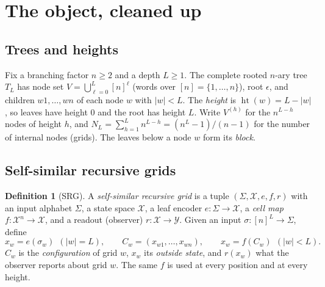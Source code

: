 \documentclass[11pt]{article}
\theoremstyle{definition}
\newtheorem{definition}[theorem]{Definition}
\newcommand{\hgt}{\operatorname{ht}}
\newcommand{\Nint}{N_{L}}
\newcommand{\cX}{\mathcal{X}}
\begin{document}
\tableofcontents

\section{The object, cleaned up}\label{sec:def}

\subsection{Trees and heights}
Fix a branching factor $n\ge 2$ and a depth $L\ge1$. The complete rooted $n$-ary tree $T_L$ has
node set $V=\bigcup_{\ell=0}^{L}[n]^\ell$ (words over $[n]=\{1,\dots,n\}$), root $\epsilon$,
and children $w1,\dots,wn$ of each node $w$ with $|w|<L$. The \emph{height} is
$\hgt(w)=L-|w|$, so leaves have height $0$ and the root has height $L$. Write $V^{(h)}$ for the
$n^{L-h}$ nodes of height $h$, and $\Nint=\sum_{h=1}^{L}n^{L-h}=(n^L-1)/(n-1)$ for the number of
internal nodes (grids). The leaves below a node $w$ form its \emph{block}.

\subsection{Self-similar recursive grids}
\begin{definition}[SRG]\label{def:srg}
A \emph{self-similar recursive grid} is a tuple $(\Sigma,\cX,e,f,r)$ with an input alphabet
$\Sigma$, a state space $\cX$, a leaf encoder $e:\Sigma\to\cX$, a \emph{cell map}
$f:\cX^n\to\cX$, and a readout (observer) $r:\cX\to\mathcal Y$. Given an input
$\sigma:[n]^L\to\Sigma$, define
\[
x_w=e(\sigma_w)\ \ (|w|=L),\qquad C_w=(x_{w1},\dots,x_{wn}),\qquad x_w=f(C_w)\ \ (|w|<L).
\]
$C_w$ is the \emph{configuration} of grid $w$, $x_w$ its \emph{outside state}, and $r(x_w)$ what
the observer reports about grid $w$. The same $f$ is used at every position and at every height.
\end{definition}
\end{document}
